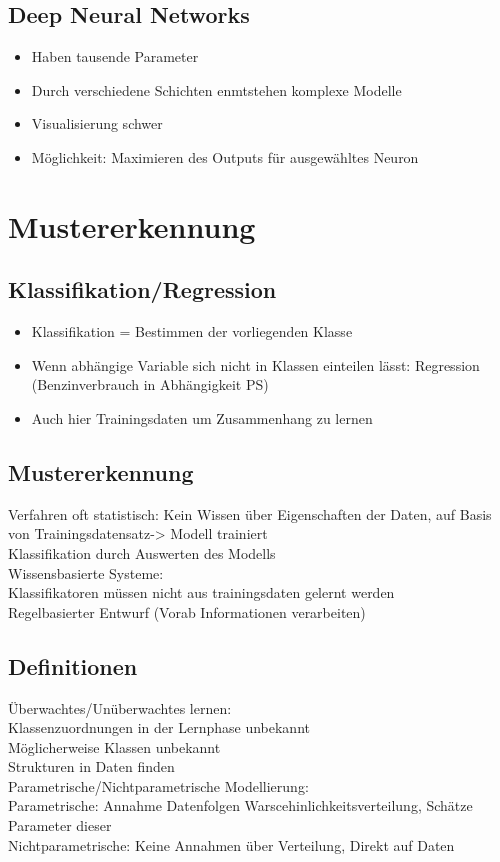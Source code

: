 \documentclass[a4paper,10pt,oneside]{article}
\begin{document}
\subsection{Deep Neural Networks}
\begin{itemize}
	\item Haben tausende Parameter
	\item Durch verschiedene Schichten enmtstehen komplexe Modelle
	\item Visualisierung schwer
	\item Möglichkeit: Maximieren des Outputs für ausgewähltes Neuron
\end{itemize}

\section{Mustererkennung}


\subsection{Klassifikation/Regression}
\begin{itemize}
	\item Klassifikation = Bestimmen der vorliegenden Klasse
	\item Wenn abhängige Variable sich nicht in Klassen einteilen lässt: Regression (Benzinverbrauch in Abhängigkeit PS)
	\item Auch hier Trainingsdaten um Zusammenhang zu lernen
\end{itemize}

\subsection{Mustererkennung}
Verfahren oft statistisch: Kein Wissen über Eigenschaften der Daten, auf Basis von Trainingsdatensatz-> Modell trainiert\\
Klassifikation durch Auswerten des Modells\\
Wissensbasierte Systeme:\\
Klassifikatoren müssen nicht aus trainingsdaten gelernt werden\\
Regelbasierter Entwurf (Vorab Informationen verarbeiten)

\subsection{Definitionen}
Überwachtes/Unüberwachtes lernen:\\
Klassenzuordnungen in der Lernphase unbekannt\\
Möglicherweise Klassen unbekannt\\
Strukturen in Daten finden\\
Parametrische/Nichtparametrische Modellierung:\\
Parametrische: Annahme Datenfolgen Warscehinlichkeitsverteilung, Schätze Parameter dieser\\
Nichtparametrische: Keine Annahmen über Verteilung, Direkt auf Daten
\end{document}
